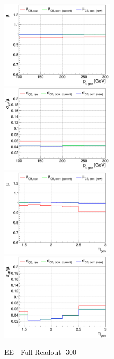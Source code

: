 \begin{figure}
\includegraphics[width=0.495\textwidth]{./plots_pdf/ECAL_plots/plotsPU/EE/FULL/pdf/GENPT/EEFULL_GENPT_0100_0300_MuOverBins.pdf}
\includegraphics[width=0.495\textwidth]{./plots_pdf/ECAL_plots/plotsPU/EE/FULL/pdf/GENPT/EEFULL_GENPT_0100_0300_EffSigmaOverBins.pdf}
\includegraphics[width=0.495\textwidth]{./plots_pdf/ECAL_plots/plotsPU/EE/FULL/pdf/GENETA/EEFULL_GENETA_0100_0300_MuOverBins.pdf}
\includegraphics[width=0.495\textwidth]{./plots_pdf/ECAL_plots/plotsPU/EE/FULL/pdf/GENETA/EEFULL_GENETA_0100_0300_EffSigmaOverBins.pdf}
\caption{EE - Full Readout -300}
\end{figure}





